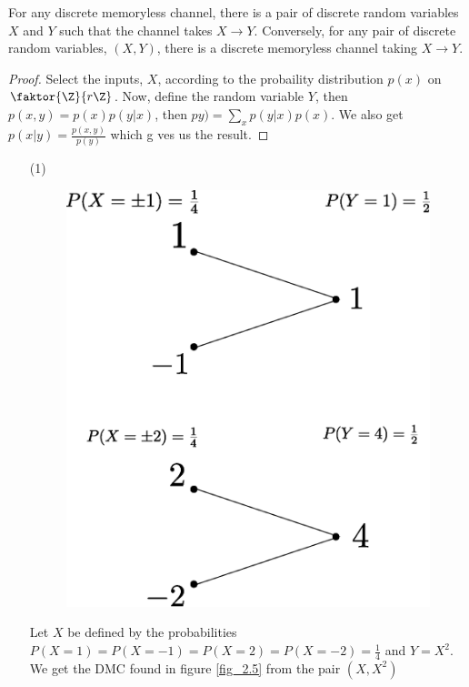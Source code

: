 \begin{lemma}\label{2.1.3}
    For any discrete memoryless channel, there is a pair of discrete random
    variables $X$ and $Y$ such that the channel takes $X \rightarrow Y$.
    Conversely, for any pair of discrete random variables, $(X,Y)$, there is a
    discrete memoryless channel taking $X \rightarrow Y$.
\end{lemma}
\begin{proof}
    Select the inputs, $X$, according to the probaility distribution  $p(x)$ on
     $\faktor{\Z}{r\Z}$. Now, define the random variable $Y$, then
     $p(x,y)=p(x)p(y|x)$, then $p y)=\sum_{x}{p(y|x)p(x)}$. We also get $p
     (x|y)=\frac{p(x,y)}{p(y)}$ which g ves us the result.
\end{proof}

\begin{example}
    \begin{enumerate}
        \item[(1)]
            \begin{figure}
                \centering
                \includegraphics[scale=0.5]{Figures/Chapter2/dmc_4.eps}
                \caption{}
                \label{fing_2.5}
            \end{figure}
            Let $X$ be defined by the probabilities
            $P(X=1)=P(X=-1)=P(X=2)=P(X=-2)=\frac{1}{4}$ and $Y=X^2$. We get the DMC
            found in figure \ref {fig_2.5} from the pair $(X,X^2)$


\end{enumerate}
\end{example}

